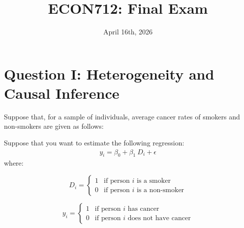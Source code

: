 \documentclass[letterpaper,12pt]{article}
\title{\vspace{-1.2in} ECON712: Final Exam}
\date{\vspace{-0.5 in} April 16th, 2026}
\theoremstyle{dotlessS}
\begin{document}
\maketitle
\vspace{-.2in}
\noindent
\vspace{-0.6 in}

\section*{ Question I: Heterogeneity and Causal Inference}
Suppose that, for a sample of individuals, average cancer rates of smokers and non-smokers are given as follows:
\begin{table}[H]
\begin{center}
\caption{Cancer Diagnosis by Age Group and Smoking Status}
\label{table:main_shock_effect}
\end{center}
\captionsetup{width=0.80\textwidth}
\captionsetup{skip=0pt}
\caption*{Notes: Sample size are given in brackets}
\end{table}
\noindent Suppose that you want to estimate the following regression:
\begin{eqnarray*}
y_i=\beta_0+\beta_1 \: D_i+\epsilon
\end{eqnarray*}
where:
\begin{center}
\begin{minipage}{0.45\textwidth}
\[
D_i=\begin{cases}
		1 & \text{if person $i$ is a smoker} \\
             0 & \text{if person $i$ is a non-smoker}
\end{cases}
\]
\end{minipage}
\hfill
\begin{minipage}{0.45\textwidth}
\[
y_i=\begin{cases}
		1 & \text{if person $i$ has cancer} \\
             0 & \text{if person $i$ does not have cancer}
\end{cases}
\]
\end{minipage}
\end{center}
\end{document}
